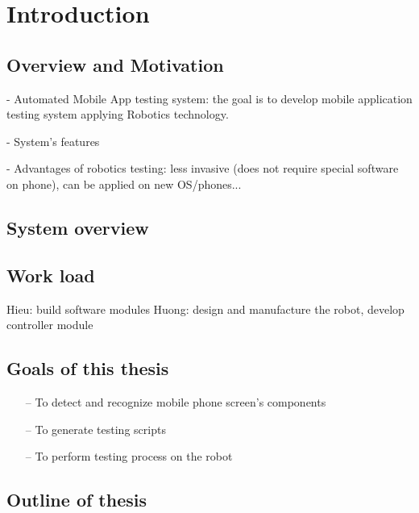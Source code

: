 \chapter{Introduction}

\section{Overview and Motivation}
- Automated Mobile App testing system: the goal is to develop mobile application testing system applying Robotics technology.

- System's features

- Advantages of robotics testing: less invasive (does not require special software on phone), can be applied on new OS/phones...

\section{System overview}

\section{Work load}
Hieu: build software modules
Huong: design and manufacture the robot, develop controller module

\section{Goals of this thesis}
	\begin{itemize}
		\item[--] To detect and recognize mobile phone screen's components
		\item[--] To generate testing scripts
		\item[--] To perform testing process on the robot
	\end{itemize}

\section{Outline of thesis}
